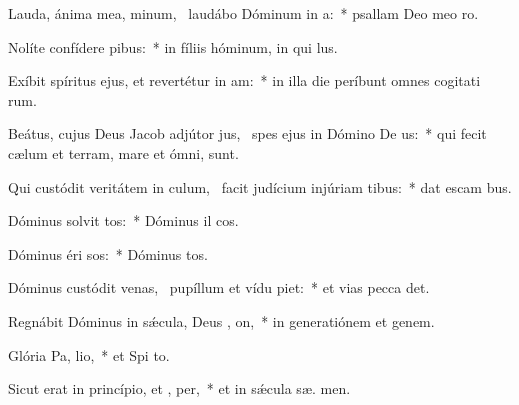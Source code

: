 \item Lauda, ánima mea, minum,~\pscross{} laudábo Dóminum in  a:~* psallam Deo meo  ro.
\item Nolíte confídere  pibus:~* in fíliis hóminum, in qui   lus.
\item Exíbit spíritus ejus, et revertétur in  am:~* in illa die períbunt omnes cogitati rum.
\item Beátus, cujus Deus Jacob adjútor jus,~\pscross{} spes ejus in Dómino De us:~* qui fecit cælum et terram, mare et ómni,    sunt.
\item Qui custódit veritátem in culum,~\pscross{} facit judícium injúriam tibus:~* dat escam bus.
\item Dóminus solvit tos:~* Dóminus il cos.
\item Dóminus éri sos:~* Dóminus  tos.
\item Dóminus custódit venas,~\pscross{} pupíllum et vídu piet:~* et vias pecca det.
\item Regnábit Dóminus in sǽcula, Deus , on,~* in generatiónem et genem.
\item Glória Pa,  lio,~* et Spi to.
\item Sicut erat in princípio, et ,  per,~* et in sǽcula sæ. men.
